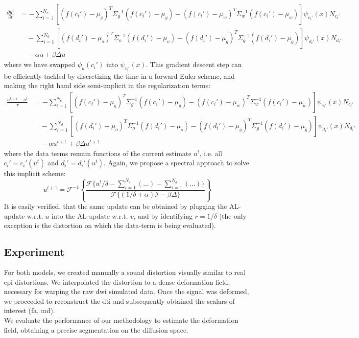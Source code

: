 %
\begin{align}
\frac{\partial u^t}{\partial t} &= - \sum_{i=1}^{N_c} \left[(f(c_i')-\mu_g)^T\Sigma_g^{-1}(f(c_i')-\mu_g) - (f(c_i')-\mu_w)^T\Sigma_w^{-1}(f(c_i')-\mu_w)\right]\psi_{c_i'}(x)N_{c_i'}\nonumber\\
&\quad -\sum_{i=1}^{N_d} \left[(f(d_i')-\mu_o)^T\Sigma_o^{-1}(f(d_i')-\mu_o) - (f(d_i')-\mu_g)^T\Sigma_g^{-1}(f(d_i')-\mu_g)\right]\psi_{d_i'}(x)N_{d_i'}\\
&\quad -\alpha u + \beta\Delta u\nonumber
\end{align}
%
where we have swapped $\psi_k(c_i')$ into $\psi_{c_i'}(x)$.
%
This gradient descent step can be efficiently tackled by discretizing 
the time in a forward Euler scheme, and making the right hand side 
semi-implicit in the regularization terms:
%
\begin{align}
\frac{u^{t+1}-u^t}{\tau} &= - \sum_{i=1}^{N_c} \left[(f(c_i')-\mu_g)^T\Sigma_g^{-1}(f(c_i')-\mu_g) - (f(c_i')-\mu_w)^T\Sigma_w^{-1}(f(c_i')-\mu_w)\right]\psi_{c_i'}(x)N_{c_i'}\nonumber\\
&\quad -\sum_{i=1}^{N_d} \left[(f(d_i')-\mu_o)^T\Sigma_o^{-1}(f(d_i')-\mu_o) - (f(d_i')-\mu_g)^T\Sigma_g^{-1}(f(d_i')-\mu_g)\right]\psi_{d_i'}(x)N_{d_i'}\nonumber\\
&\quad -\alpha u^{t+1} + \beta\Delta u^{t+1}
\end{align}
%
where the data terms remain functions of the current estimate $u^t$, i.e. 
all $c_i' = c_i'(u^t)$ and $d_i' = d_i'(u^t)$. Again, we propose a spectral 
approach to solve this implicit scheme:
%
\begin{equation}
u^{t+1} = \mathcal{F}^{-1}\left\{ \frac{\mathcal{F}\{u^t/\delta - \sum_{i=1}^{N_c}(\ldots) - \sum_{i=1}^{N_d}(\ldots)  \}}{\mathcal{F}\{(1/\delta+\alpha)\mathcal{I}-\beta\Delta\}} \right\}
\end{equation}
%
It is easily verified, that the same update can be obtained by plugging the 
AL-update w.r.t. $u$ into the AL-update w.r.t. $v$, and by identifying 
$r = 1/\delta$ (the only exception is the distortion on which the data-term 
is being evaluated).


\subsection{Experiment}
%
For both models, we created manually a sound distortion visually similar
to real \ac{epi} distortions. We interpolated the distortion to a 
dense deformation field, necessary for warping the raw \ac{dwi} simulated
data. Once the signal was deformed, we proceeded to reconstruct the
\ac{dti} and subsequently obtained the scalars of interest (\ac{fa}, \ac{md}).\\

We evaluate the performance of our methodology to estimate the deformation
field, obtaining a precise segmentation on the diffusion space.
